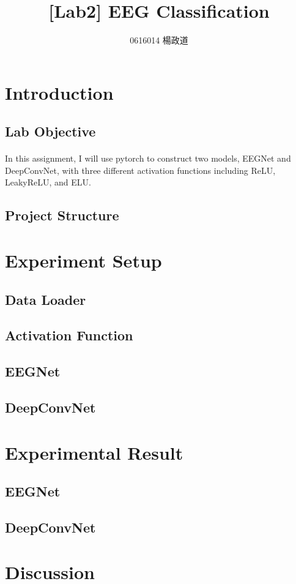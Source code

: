 \title{[Lab2] EEG Classification}
\author{0616014 楊政道}
\maketitle
\thispagestyle{fancy}
\section{Introduction}
\subsection{Lab Objective}
\paragraph{}
In this assignment, I will use pytorch to construct two models, EEGNet and DeepConvNet, with three different activation functions including ReLU, LeakyReLU, and ELU.
\subsection{Project Structure}
\section{Experiment Setup}
\subsection{Data Loader}
\subsection{Activation Function}
\subsection{EEGNet}
\subsection{DeepConvNet}
\section{Experimental Result}
\subsection{EEGNet}
\subsection{DeepConvNet}
\section{Discussion}
